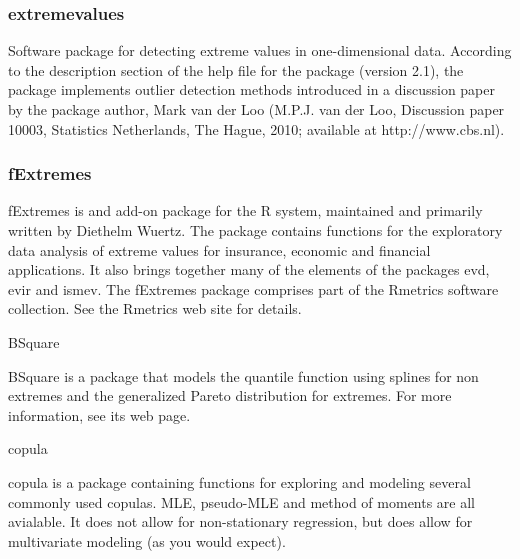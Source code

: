 \documentclass[MAIN.tex]{subfiles}
\begin{document}
\begin{frame}
	\frametitle{	extremevalues}
	
	Software package for detecting extreme values in one-dimensional data. According to the description section of the help file for the package (version 2.1), the package implements outlier detection methods introduced in a discussion paper by the package author, Mark van der Loo (M.P.J. van der Loo, Discussion paper 10003, Statistics Netherlands, The Hague, 2010; available at http://www.cbs.nl).
	

\end{frame}
\begin{frame}
	\frametitle{	fExtremes}
	
	fExtremes is and add-on package for the R system, maintained and primarily written by Diethelm Wuertz. The package contains functions for the exploratory data analysis of extreme values for insurance, economic and financial applications. It also brings together many of the elements of the packages evd, evir and ismev. The fExtremes package comprises part of the Rmetrics software collection. See the Rmetrics web site for details.
	
	
\end{frame}
\begin{frame}
	BSquare
	
	BSquare is a package that models the quantile function using splines for non extremes and the generalized Pareto distribution for extremes. For more information, see its web page.
	
	copula
	
	copula is a package containing functions for exploring and modeling several commonly used copulas. MLE, pseudo-MLE and method of moments are all avialable. It does not allow for non-stationary regression, but does allow for multivariate modeling (as you would expect).
	
\end{frame}
\end{document}
